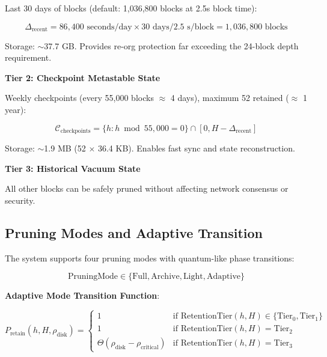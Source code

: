 \documentclass[11pt,a4paper]{article}
\begin{document}
Last 30 days of blocks (default: 1,036,800 blocks at 2.5s block time):

\begin{equation}
\Delta_{\text{recent}} = 86,400 \text{ seconds/day} \times 30 \text{ days} / 2.5 \text{ s/block} = 1,036,800 \text{ blocks}
\end{equation}

Storage: $\sim$37.7 GB. Provides re-org protection far exceeding the 24-block depth requirement.

\textbf{Tier 2: Checkpoint Metastable State}

Weekly checkpoints (every 55,000 blocks $\approx$ 4 days), maximum 52 retained ($\approx$ 1 year):

\begin{equation}
\mathcal{C}_{\text{checkpoints}} = \{h : h \bmod 55,000 = 0\} \cap [0, H - \Delta_{\text{recent}}]
\end{equation}

Storage: $\sim$1.9 MB (52 $\times$ 36.4 KB). Enables fast sync and state reconstruction.

\textbf{Tier 3: Historical Vacuum State}

All other blocks can be safely pruned without affecting network consensus or security.

\subsection{Pruning Modes and Adaptive Transition}

The system supports four pruning modes with quantum-like phase transitions:

\begin{equation}
\text{PruningMode} \in \{\text{Full}, \text{Archive}, \text{Light}, \text{Adaptive}\}
\end{equation}

\textbf{Adaptive Mode Transition Function}:

\begin{equation}
P_{\text{retain}}(h, H, \rho_{\text{disk}}) = \begin{cases}
1 & \text{if } \text{RetentionTier}(h, H) \in \{\text{Tier}_0, \text{Tier}_1\} \\
1 & \text{if } \text{RetentionTier}(h, H) = \text{Tier}_2 \\
\Theta(\rho_{\text{disk}} - \rho_{\text{critical}}) & \text{if } \text{RetentionTier}(h, H) = \text{Tier}_3
\end{cases}
\end{equation}
\end{document}
